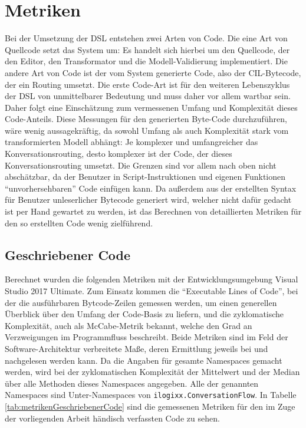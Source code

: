 \section{Metriken}
Bei der Umsetzung der DSL entstehen zwei Arten von Code. Die eine Art von Quellcode setzt das System um: Es handelt sich hierbei um den Quellcode, der den Editor, den Transformator und die Modell-Validierung implementiert. Die andere Art von Code ist der vom System generierte Code, also der CIL-Bytecode, der ein Routing umsetzt. Die erste Code-Art ist für den weiteren Lebenszyklus der DSL von unmittelbarer Bedeutung und muss daher vor allem wartbar sein. Daher folgt eine Einschätzung zum vermessenen Umfang und Komplexität dieses Code-Anteils. Diese Messungen für den generierten Byte-Code durchzuführen, wäre  wenig aussagekräftig, da sowohl Umfang als auch Komplexität stark vom transformierten Modell abhängt: Je komplexer und umfangreicher das Konversationsrouting, desto komplexer ist der Code, der dieses Konversationsrouting umsetzt. Die Grenzen sind vor allem nach oben nicht abschätzbar, da der Benutzer in Script-Instruktionen und eigenen Funktionen ``unvorhersehbaren'' Code einfügen kann. Da außerdem aus der erstellten Syntax für Benutzer unleserlicher Bytecode generiert wird, welcher nicht dafür gedacht ist per Hand gewartet zu werden, ist das Berechnen von detaillierten Metriken für den so erstellten Code wenig zielführend. 

\subsection{Geschriebener Code}
Berechnet wurden die folgenden Metriken mit der Entwicklungsumgebung Visual Studio 2017 Ultimate. Zum Einsatz kommen die ``Executable Lines of Code'', bei der die ausführbaren Bytcode-Zeilen gemessen werden, um einen generellen Überblick über den Umfang der Code-Basis zu liefern, und die zyklomatische Komplexität, auch als McCabe-Metrik bekannt, welche den Grad an Verzweigungen im Programmfluss beschreibt. Beide Metriken sind im Feld der Software-Architektur verbreitete Maße, deren Ermittlung jeweils bei \cite[S. 35ff]{Laird:06} und \cite[S. 58ff]{Laird:06} nachgelesen werden kann. Da die Angaben für gesamte Namespaces gemacht werden, wird bei der zyklomatischen Komplexität der Mittelwert und der Median über alle Methoden dieses Namespaces angegeben. Alle der genannten Namespaces sind Unter-Namespaces von \texttt{ilogixx.ConversationFlow}. In Tabelle \ref{tab:metrikenGeschriebenerCode} sind die gemessenen Metriken für den im Zuge der vorliegenden Arbeit händisch verfassten Code zu sehen.


